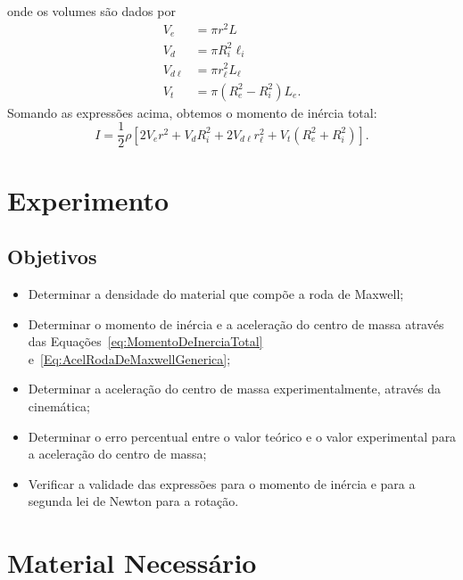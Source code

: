 %
onde os volumes são dados por
\begin{align}
    V_e &= \pi r^2 L \\
    V_d &= \pi R_i^2 \ell_i \\
    V_{d\ell} &= \pi r_\ell^2 L_\ell\\
    V_t &= \pi (R_e^2 - R_i^2)L_e.
\end{align}
%
Somando as expressões acima, obtemos o momento de inércia total:
\begin{equation}\label{eq:MomentoDeInerciaTotal}
    I = \frac{1}{2} \rho [2V_e r^2 + V_d R_i^2 + 2 V_{d\ell} r_ \ell^2+ V_t (R_e^2 + R_i^2)].
\end{equation}

\section{Experimento}

\subsection{Objetivos}
\label{Sec:ObjetivosRodaDeMaxwell}

\begin{itemize}
	\item Determinar a densidade do material que compõe a roda de Maxwell;
	\item Determinar o momento de inércia e a aceleração do centro de massa através das Equações~\eqref{eq:MomentoDeInerciaTotal} e~\eqref{Eq:AcelRodaDeMaxwellGenerica};
	\item Determinar a aceleração do centro de massa experimentalmente, através da cinemática;
    \item Determinar o erro percentual entre o valor teórico e o valor experimental para a aceleração do centro de massa;
    \item Verificar a validade das expressões para o momento de inércia e para a segunda lei de Newton para a rotação.
\end{itemize}

\section{Material Necessário}

